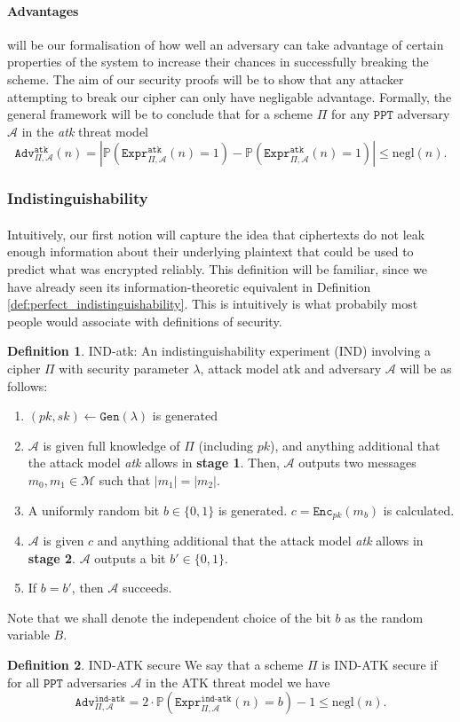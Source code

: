 \documentclass{article}
\theoremstyle{definition}
\newtheorem{definition}{Definition}[section]
\newcommand{\Enc}{\texttt{Enc}}
\newcommand{\Gen}{\texttt{Gen}}
\newcommand{\M}{\mathcal{M}}
\newcommand{\A}{\mathcal{A}}
\newcommand{\Prob}{\mathbb{P}}
\newcommand{\PPT}{\texttt{PPT}}
\newcommand{\negl}{\text{negl}}
\newcommand{\Expr}[2]{\texttt{Expr}^{\texttt{#1}}_{#2}}
\newcommand{\Adv}[2]{\texttt{Adv}^{\texttt{#1}}_{#2}}
\begin{document}
\paragraph{Advantages} will be our formalisation of how well an adversary can
take advantage of certain properties of the system to increase their chances in
successfully breaking the scheme. The aim of our security proofs will be to show
that any attacker attempting to break our cipher can only have negligable
advantage. Formally, the general framework will be to conclude that for a scheme
$\Pi$ for any $\PPT$ adversary $\A$ in the \textit{atk} threat model
\[
  \Adv{atk}{\Pi, \A}(n) = |\Prob(\Expr{atk}{\Pi, \A}(n) = 1) - \Prob(\Expr{atk}{\Pi,
    \A}(n) = 1)| \leq \negl(n).
\]
\subsubsection{Indistinguishability}
\paragraph{} Intuitively, our first notion will capture the idea that
ciphertexts do not leak enough information about their underlying plaintext that
could be used to predict what was encrypted reliably. This definition will be
familiar, since we have already seen its information-theoretic equivalent in
Definition \ref{def:perfect_indistinguishability}. This is intuitively is what probabily
most people would associate with definitions of security.
\begin{definition}{IND-atk:}
  An indistinguishability experiment (IND) involving a cipher $\Pi$ with
  security parameter $\lambda$, attack model atk and adversary $\A$ will be as follows:
  \begin{enumerate}
  \item $(pk, sk) \leftarrow \Gen(\lambda)$ is generated
  \item $\A$ is given full knowledge of $\Pi$ (including $pk$), and anything additional that the
    attack model \textit{atk} allows in \textbf{stage 1}. Then, $\A$ outputs two messages
    $m_0, m_1 \in \M$ such that $|m_1| = |m_2|$.
  \item A uniformly random bit $b \in \{0, 1\}$ is generated. $c = \Enc_{pk}(m_b)$ is calculated.
  \item $\A$ is given $c$ and anything additional that the attack model
    \textit{atk} allows in \textbf{stage 2}. $\A$ outputs a bit $b' \in \{0,
    1\}$.
  \item If $b = b'$, then $\A$ succeeds.
  \end{enumerate}
\end{definition}
Note that we shall denote the independent choice of the bit $b$ as the random
variable $B$.
\begin{definition}{IND-ATK secure}
  \label{def:adv_ind}
  We say that a scheme $\Pi$ is IND-ATK secure if for all $\PPT$ adversaries
  $\A$ in the ATK threat model we have
  \[
    \Adv{ind-atk}{\Pi, \A} = 2\cdot\Prob(\Expr{ind-atk}{\Pi, \A}(n) = b)
    - 1
    \leq \negl(n).
  \]
\end{definition}
\end{document}
